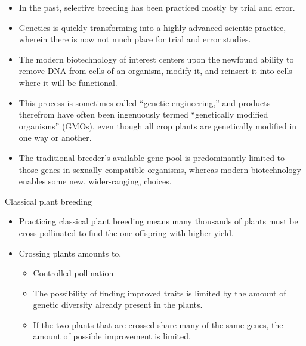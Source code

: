 \documentclass[
  ignorenonframetext,
  aspectratio=169]{beamer}
\providecommand{\tightlist}{%
  \setlength{\itemsep}{0pt}\setlength{\parskip}{0pt}}
\begin{document}
\begin{frame}{}
\protect\hypertarget{section}{}
\begin{itemize}
\tightlist
\item
  In the past, selective breeding has been practiced mostly by trial and
  error.
\item
  \alert{Genetics} is quickly transforming into a highly advanced
  scientic practice, wherein there is now not much place for trial and
  error studies.
\item
  The modern biotechnology of interest centers upon the newfound ability
  to remove DNA from cells of an organism, modify it, and reinsert it
  into cells where it will be functional.
\item
  This process is sometimes called ``genetic engineering,'' and products
  therefrom have often been ingenuously termed ``genetically modified
  organisms'' (GMOs), even though all crop plants are genetically
  modified in one way or another.
\item
  The traditional breeder's available gene pool is predominantly limited
  to those genes in sexually-compatible organisms, whereas modern
  biotechnology enables some new, wider-ranging, choices.
\end{itemize}
\end{frame}

\begin{frame}{Classical plant breeding}
\protect\hypertarget{classical-plant-breeding}{}
\begin{itemize}
\tightlist
\item
  Practicing classical plant breeding means many thousands of plants
  must be cross-pollinated to find the one offspring with higher yield.
\item
  Crossing plants amounts to,

  \begin{itemize}
  \tightlist
  \item
    Controlled pollination
  \item
    The possibility of finding improved traits is limited by the amount
    of genetic diversity already present in the plants.
  \item
    If the two plants that are crossed share many of the same genes, the
    amount of possible improvement is limited.
  \end{itemize}
\end{itemize}
\end{frame}
\end{document}
